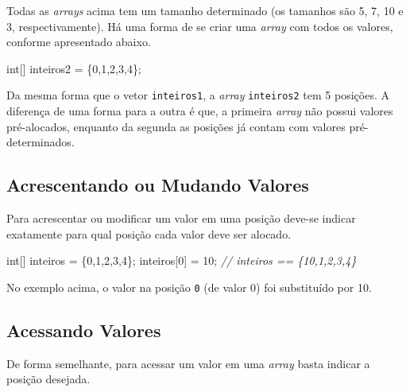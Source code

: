\documentclass[
]{book}
\newenvironment{Shaded}{\begin{snugshade}}{\end{snugshade}}
\newcommand{\CommentTok}[1]{\textcolor[rgb]{0.56,0.35,0.01}{\textit{#1}}}
\newcommand{\DataTypeTok}[1]{\textcolor[rgb]{0.13,0.29,0.53}{#1}}
\newcommand{\DecValTok}[1]{\textcolor[rgb]{0.00,0.00,0.81}{#1}}
\newcommand{\NormalTok}[1]{#1}
\begin{document}
Todas as \emph{arrays} acima tem um tamanho determinado (os tamanhos são 5, 7, 10 e 3, respectivamente). Há uma forma de se criar uma \emph{array} com todos os valores, conforme apresentado abaixo.

\begin{Shaded}
\begin{Highlighting}[]
\DataTypeTok{int}\NormalTok{[] inteiros2 = \{}\DecValTok{0}\NormalTok{,}\DecValTok{1}\NormalTok{,}\DecValTok{2}\NormalTok{,}\DecValTok{3}\NormalTok{,}\DecValTok{4}\NormalTok{\};}
\end{Highlighting}
\end{Shaded}

Da mesma forma que o vetor \texttt{inteiros1}, a \emph{array} \texttt{inteiros2} tem 5 posições. A diferença de uma forma para a outra é que, a primeira \emph{array} não possui valores pré-alocados, enquanto da segunda as posições já contam com valores pré-determinados.

\hypertarget{acrescentando-ou-mudando-valores}{%
\subsection{Acrescentando ou Mudando Valores}\label{acrescentando-ou-mudando-valores}}

Para acrescentar ou modificar um valor em uma posição deve-se indicar exatamente para qual posição cada valor deve ser alocado.

\begin{Shaded}
\begin{Highlighting}[]
\DataTypeTok{int}\NormalTok{[] inteiros = \{}\DecValTok{0}\NormalTok{,}\DecValTok{1}\NormalTok{,}\DecValTok{2}\NormalTok{,}\DecValTok{3}\NormalTok{,}\DecValTok{4}\NormalTok{\};}
\NormalTok{inteiros[}\DecValTok{0}\NormalTok{] = }\DecValTok{10}\NormalTok{;}
\CommentTok{// inteiros == \{10,1,2,3,4\}}
\end{Highlighting}
\end{Shaded}

No exemplo acima, o valor na posição \texttt{0} (de valor 0) foi substituído por 10.

\hypertarget{acessando-valores}{%
\subsection{Acessando Valores}\label{acessando-valores}}

De forma semelhante, para acessar um valor em uma \emph{array} basta indicar a posição desejada.
\end{document}
